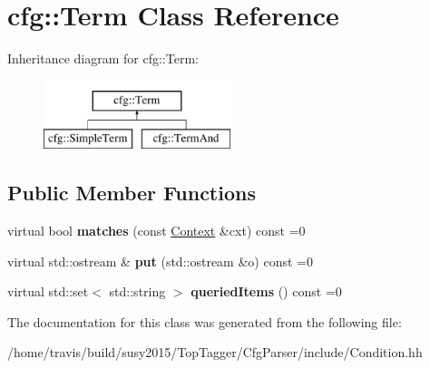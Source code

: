 \hypertarget{classcfg_1_1Term}{\section{cfg\-:\-:Term Class Reference}
\label{classcfg_1_1Term}
}
Inheritance diagram for cfg\-:\-:Term\-:\begin{figure}[H]
\begin{center}
\leavevmode
\includegraphics[height=2.000000cm]{classcfg_1_1Term}
\end{center}
\end{figure}
\subsection*{Public Member Functions}
\begin{DoxyCompactItemize}
\item 
\hypertarget{classcfg_1_1Term_a8cfe026d2155bfe41b41252a4bc12055}{virtual bool {\bfseries matches} (const \hyperlink{classcfg_1_1Context}{Context} \&cxt) const =0}\label{classcfg_1_1Term_a8cfe026d2155bfe41b41252a4bc12055}

\item 
\hypertarget{classcfg_1_1Term_af47c75ea82799805b7daafd789a86c6d}{virtual std\-::ostream \& {\bfseries put} (std\-::ostream \&o) const =0}\label{classcfg_1_1Term_af47c75ea82799805b7daafd789a86c6d}

\item 
\hypertarget{classcfg_1_1Term_a16d79489fd5a64500706f2ad98161bad}{virtual std\-::set$<$ std\-::string $>$ {\bfseries queried\-Items} () const =0}\label{classcfg_1_1Term_a16d79489fd5a64500706f2ad98161bad}

\end{DoxyCompactItemize}


The documentation for this class was generated from the following file\-:\begin{DoxyCompactItemize}
\item 
/home/travis/build/susy2015/\-Top\-Tagger/\-Cfg\-Parser/include/Condition.\-hh\end{DoxyCompactItemize}
